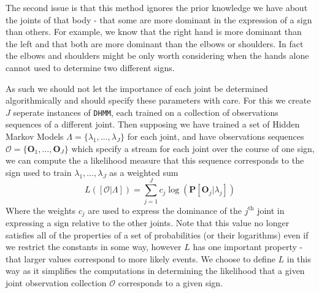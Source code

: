 The second issue is that this method ignores the prior knowledge we have about the joints of that body - that some are more dominant in the expression of a sign than others. For example, we know that the right hand is more dominant than the left and that both are more dominant than the elbows or shoulders. In fact the elbows and shoulders might be only worth considering when the hands alone cannot used to determine two different signs.

As such we should not let the importance of each joint be determined algorithmically and should specify these parameters with care. For this we create $J$ seperate instances of \verb|DHMM|, each trained on a collection of observations sequences of a different joint. Then supposing we have trained a set of Hidden Markov Models $\Lambda = \{\lambda_1, \dots, \lambda_J\}$ for each joint, and have observations sequences $\mathcal{O} = \{\mathbf{O}_1,\dots, \mathbf{O}_J\}$ which specify a stream for each joint over the course of one sign, we can compute the a likelihood measure that this sequence corresponds to the sign used to train $\lambda_1, \dots, \lambda_J$ as a weighted sum
\begin{equation*}
L([\mathcal{O} | \Lambda ]) = \sum_{j=1}^{J} c_j \log(\mathbf{P}[\mathbf{O}_j | \lambda_j])
\end{equation*}
Where the weights $c_j$ are used to express the dominance of the $j^\text{th}$ joint in expressing a sign relative to the other joints. Note that this value no longer satisfies all of the properties of a set of probabilities (or their logarithms) even if we restrict the constants in some way, however $L$ has one important property - that larger values correspond to more likely events. We choose to define $L$ in this way as it simplifies the computations in determining the likelihood that a given joint observation collection $\mathcal{O}$ corresponds to a given sign.

